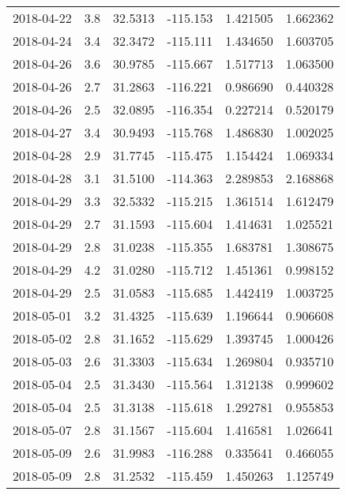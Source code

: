 \begin{tabular}{lrrrrr}
2018-04-22 &       3.8 &  32.5313 &  -115.153 &         1.421505 &         1.662362 \\
2018-04-24 &       3.4 &  32.3472 &  -115.111 &         1.434650 &         1.603705 \\
2018-04-26 &       3.6 &  30.9785 &  -115.667 &         1.517713 &         1.063500 \\
2018-04-26 &       2.7 &  31.2863 &  -116.221 &         0.986690 &         0.440328 \\
2018-04-26 &       2.5 &  32.0895 &  -116.354 &         0.227214 &         0.520179 \\
2018-04-27 &       3.4 &  30.9493 &  -115.768 &         1.486830 &         1.002025 \\
2018-04-28 &       2.9 &  31.7745 &  -115.475 &         1.154424 &         1.069334 \\
2018-04-28 &       3.1 &  31.5100 &  -114.363 &         2.289853 &         2.168868 \\
2018-04-29 &       3.3 &  32.5332 &  -115.215 &         1.361514 &         1.612479 \\
2018-04-29 &       2.7 &  31.1593 &  -115.604 &         1.414631 &         1.025521 \\
2018-04-29 &       2.8 &  31.0238 &  -115.355 &         1.683781 &         1.308675 \\
2018-04-29 &       4.2 &  31.0280 &  -115.712 &         1.451361 &         0.998152 \\
2018-04-29 &       2.5 &  31.0583 &  -115.685 &         1.442419 &         1.003725 \\
2018-05-01 &       3.2 &  31.4325 &  -115.639 &         1.196644 &         0.906608 \\
2018-05-02 &       2.8 &  31.1652 &  -115.629 &         1.393745 &         1.000426 \\
2018-05-03 &       2.6 &  31.3303 &  -115.634 &         1.269804 &         0.935710 \\
2018-05-04 &       2.5 &  31.3430 &  -115.564 &         1.312138 &         0.999602 \\
2018-05-04 &       2.5 &  31.3138 &  -115.618 &         1.292781 &         0.955853 \\
2018-05-07 &       2.8 &  31.1567 &  -115.604 &         1.416581 &         1.026641 \\
2018-05-09 &       2.6 &  31.9983 &  -116.288 &         0.335641 &         0.466055 \\
2018-05-09 &       2.8 &  31.2532 &  -115.459 &         1.450263 &         1.125749 \\

\end{tabular}
